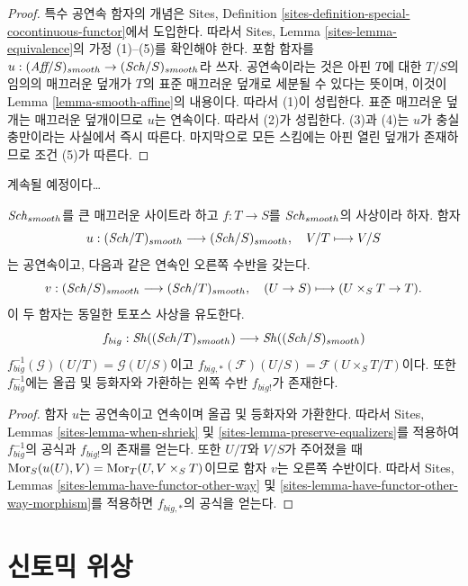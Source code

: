 \begin{proof}
특수 공연속 함자의 개념은 Sites, Definition
\ref{sites-definition-special-cocontinuous-functor}에서 도입한다. 따라서
Sites, Lemma \ref{sites-lemma-equivalence}의 가정 (1)--(5)를 확인해야
한다. 포함 함자를
$u : (\textit{Aff}/S)_{smooth} \to (\mathit{Sch}/S)_{smooth}$라 쓰자. 공연속이라는
것은 아핀 $T$에 대한 $T/S$의 임의의 매끄러운 덮개가 $T$의 표준
매끄러운 덮개로 세분될 수 있다는 뜻이며, 이것이 Lemma
\ref{lemma-smooth-affine}의 내용이다. 따라서 (1)이 성립한다. 표준
매끄러운 덮개는 매끄러운 덮개이므로 $u$는 연속이다. 따라서 (2)가
성립한다. (3)과 (4)는 $u$가 충실충만이라는 사실에서 즉시 따른다.
마지막으로 모든 스킴에는 아핀 열린 덮개가 존재하므로 조건 (5)가
따른다.
\end{proof}

\noindent
계속될 예정이다\ldots

\begin{lemma}
\label{lemma-morphism-big-smooth}
$\mathit{Sch}_{smooth}$를 큰 매끄러운 사이트라 하고
$f : T \to S$를 $\mathit{Sch}_{smooth}$의 사상이라 하자. 함자
$$
u : (\mathit{Sch}/T)_{smooth} \longrightarrow (\mathit{Sch}/S)_{smooth},
\quad
V/T \longmapsto V/S
$$
는 공연속이고, 다음과 같은 연속인 오른쪽 수반을 갖는다.
$$
v : (\mathit{Sch}/S)_{smooth} \longrightarrow (\mathit{Sch}/T)_{smooth},
\quad
(U \to S) \longmapsto (U \times_S T \to T).
$$
이 두 함자는 동일한 토포스 사상을 유도한다.
$$
f_{big} :
\mathop{\mathit{Sh}}\nolimits((\mathit{Sch}/T)_{smooth})
\longrightarrow
\mathop{\mathit{Sh}}\nolimits((\mathit{Sch}/S)_{smooth})
$$
$f_{big}^{-1}(\mathcal{G})(U/T) = \mathcal{G}(U/S)$이고
$f_{big, *}(\mathcal{F})(U/S) = \mathcal{F}(U \times_S T/T)$이다.
또한 $f_{big}^{-1}$에는 올곱 및 등화자와 가환하는 왼쪽 수반
$f_{big!}$가 존재한다.
\end{lemma}

\begin{proof}
함자 $u$는 공연속이고 연속이며 올곱 및 등화자와 가환한다. 따라서
Sites, Lemmas \ref{sites-lemma-when-shriek} 및
\ref{sites-lemma-preserve-equalizers}를 적용하여 $f_{big}^{-1}$의 공식과
$f_{big!}$의 존재를 얻는다. 또한 $U/T$와 $V/S$가 주어졌을 때
$\mathop{\mathrm{Mor}}\nolimits_S(u(U), V) = \mathop{\mathrm{Mor}}\nolimits_T(U, V \times_S T)$이므로 함자 $v$는 오른쪽
수반이다. 따라서 Sites, Lemmas
\ref{sites-lemma-have-functor-other-way} 및
\ref{sites-lemma-have-functor-other-way-morphism}를 적용하면
$f_{big, *}$의 공식을 얻는다.
\end{proof}











\section{신토믹 위상}
\label{section-syntomic}

